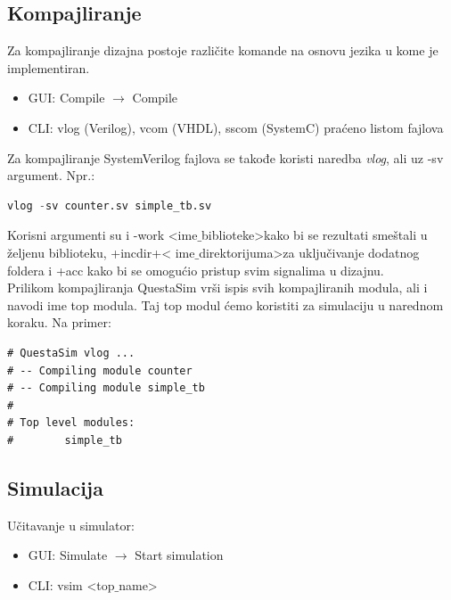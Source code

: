 
\subsection{Kompajliranje}

Za kompajliranje dizajna postoje različite komande na osnovu jezika u kome je
implementiran.

\begin{itemize}
\item GUI: Compile \(\rightarrow\) Compile
\item CLI: vlog (Verilog), vcom (VHDL), sscom (SystemC) praćeno listom fajlova
\end{itemize}

Za kompajliranje SystemVerilog fajlova se takođe koristi naredba \emph{vlog},
ali uz -sv argument. Npr.:

\begin{lstlisting}[language=Python]
vlog -sv counter.sv simple_tb.sv
\end{lstlisting}

Korisni argumenti su i -work \textless ime\(\_\)biblioteke\textgreater kako bi
se rezultati smeštali u željenu biblioteku, +incdir+\textless
ime\(\_\)direktorijuma\textgreater za uključivanje dodatnog foldera i +acc kako
bi se omogućio pristup svim signalima u dizajnu.\\

Prilikom kompajliranja QuestaSim vrši ispis svih kompajliranih modula, ali i
navodi ime top modula.
Taj top modul ćemo koristiti za simulaciju u narednom koraku.
Na primer:

\begin{verbatim}
# QuestaSim vlog ...
# -- Compiling module counter
# -- Compiling module simple_tb
#
# Top level modules:
#        simple_tb
\end{verbatim}


\subsection{Simulacija}

Učitavanje u simulator:
\begin{itemize}
\item GUI: Simulate \(\rightarrow\) Start simulation
\item CLI: vsim \textless top\(\_\)name\textgreater
\end{itemize}

